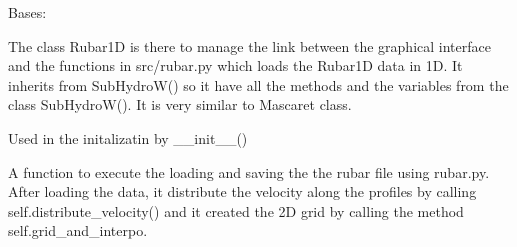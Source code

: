 \documentclass[letterpaper,10pt,english]{sphinxmanual}
\begin{document}
\begin{fulllineitems}
\label{\detokenize{index:src_GUI.hydro_GUI_2.Rubar1D}}
Bases: {\hyperref[\detokenize{index:src_GUI.hydro_GUI_2.SubHydroW}]{}}

The class Rubar1D is there to manage the link between the graphical interface and the functions in src/rubar.py
which loads the Rubar1D data in 1D. It inherits from SubHydroW() so it have all the methods and the variables
from the class SubHydroW(). It is very similar to Mascaret class.

\begin{fulllineitems}
\label{\detokenize{index:src_GUI.hydro_GUI_2.Rubar1D.init_iu}}
Used in the initalizatin by \_\_init\_\_()

\end{fulllineitems}


\begin{fulllineitems}
\label{\detokenize{index:src_GUI.hydro_GUI_2.Rubar1D.load_rubar1d}}
A function to execute the loading and saving the the rubar file using rubar.py. After loading the data,
it distribute the velocity along the profiles by calling self.distribute\_velocity() and it created the 2D grid
by calling the method self.grid\_and\_interpo.

\end{fulllineitems}


\end{fulllineitems}

\end{document}
